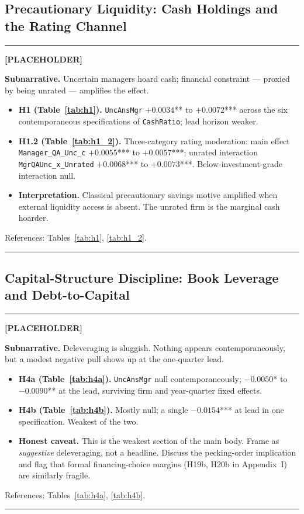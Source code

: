 \documentclass[11pt,a4paper,twocolumn]{article}
\newenvironment{placeholder}{%
  \par\medskip\noindent%
  {\color{placeholderaccent}\rule{\linewidth}{0.4pt}}\par%
  \noindent\textbf{\color{placeholderaccent}[PLACEHOLDER]}\par%
  \smallskip\itshape%
}{%
  \par\upshape\smallskip%
  {\color{placeholderaccent}\rule{\linewidth}{0.4pt}}\par\medskip%
}
\begin{document}
\subsection{Precautionary Liquidity: Cash Holdings and the Rating Channel}
\label{sec:liquidity}
\begin{placeholder}
\textbf{Subnarrative.} Uncertain managers hoard cash; financial
constraint --- proxied by being unrated --- amplifies the effect.
\begin{itemize}
  \item \textbf{H1 (Table~\ref{tab:h1}).} \texttt{UncAnsMgr}
        $+0.0034$** to $+0.0072$*** across the six contemporaneous
        specifications of \texttt{CashRatio}; lead horizon weaker.
  \item \textbf{H1.2 (Table~\ref{tab:h1_2}).} Three-category rating
        moderation: main effect \texttt{Manager\_QA\_Unc\_c}
        $+0.0055$*** to $+0.0057$***; unrated interaction
        \texttt{MgrQAUnc\_x\_Unrated} $+0.0068$*** to $+0.0073$***.
        Below-investment-grade interaction null.
  \item \textbf{Interpretation.} Classical precautionary savings motive
        \citep{BatesKahleStulz2009} amplified when external liquidity
        access is absent. The unrated firm is the marginal cash hoarder.
\end{itemize}
References: Tables~\ref{tab:h1}, \ref{tab:h1_2}.
\end{placeholder}

\subsection{Capital-Structure Discipline: Book Leverage and Debt-to-Capital}
\label{sec:leverage}
\begin{placeholder}
\textbf{Subnarrative.} Deleveraging is sluggish. Nothing appears
contemporaneously, but a modest negative pull shows up at the
one-quarter lead.
\begin{itemize}
  \item \textbf{H4a (Table~\ref{tab:h4a}).} \texttt{UncAnsMgr} null
        contemporaneously; $-0.0050$* to $-0.0090$** at the lead,
        surviving firm and year-quarter fixed effects.
  \item \textbf{H4b (Table~\ref{tab:h4b}).} Mostly null; a single
        $-0.0154$*** at lead in one specification. Weakest of the two.
  \item \textbf{Honest caveat.} This is the weakest section of the
        main body. Frame as \emph{suggestive} deleveraging, not a
        headline. Discuss the pecking-order implication and flag that
        formal financing-choice margins (H19b, H20b in Appendix~I)
        are similarly fragile.
\end{itemize}
References: Tables~\ref{tab:h4a}, \ref{tab:h4b}.
\end{placeholder}
\end{document}
